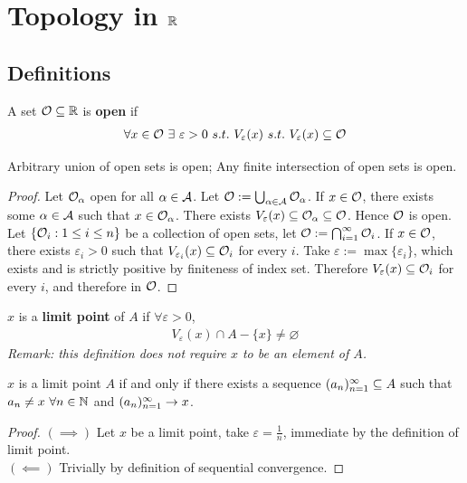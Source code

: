 \documentclass[11pt]{article}
\begin{document}
	\section{Topology in $\mathbb{R}$}
	\subsection{Definitions}
	\begin{definition}
		A set $\mathcal{{O}} \subseteq \mathbb{R}$ is \textbf{open} if
		\begin{align}
			\forall x \in \mc{O}\ \exists\ \varepsilon > 0\ s.t.\ V_\varepsilon(x)\ s.t.\ V_\varepsilon(x) \subseteq \mc{O}
		\end{align}
	\end{definition}
	
	\begin{theorem}
		Arbitrary union of open sets is open; Any finite intersection of open sets is open.
	\end{theorem}
	
	\begin{proof}
		Let $\mathcal{{O}}_\alpha$ open for all $\alpha \in \mathcal{{A}}$. Let $\mathcal{{O}} := \bigcup_{\alpha \in \mathcal{{A}}} \mathcal{{O}}_\alpha$. If $x \in \mathcal{{O}}$, there exists some $\alpha \in \mathcal{{A}}$ such that $x \in \mathcal{{O}}_\alpha$. There exists $V_\varepsilon(x) \subseteq \mathcal{{O}}_{\alpha} \subseteq \mathcal{{O}}$. Hence $\mathcal{{O}}$ is open.
		\\
		Let $\{\mathcal{{O}}_i: 1 \leq i \leq n\}$ be a collection of open sets, let $\mathcal{{O}} := \bigcap_{i=1}^\infty \mathcal{{O}}_i$. If $x \in \mathcal{{O}}$, there exists $\varepsilon_i > 0$ such that $V_{\varepsilon_i}(x) \subseteq \mathcal{{O}}_i$ for every $i$. Take $\varepsilon := \max\{\varepsilon_i\}$, which exists and is strictly positive by finiteness of index set. Therefore $V_\varepsilon(x) \subseteq \mathcal{{O}}_i$ for every $i$, and therefore in $\mathcal{{O}}$.
	\end{proof}
	
	\begin{definition}
		$x$ is a \textbf{limit point} of $A$ if $\forall \varepsilon > 0$,
		\begin{align}
			V_\varepsilon(x) \cap A - \{x\} \neq \varnothing
		\end{align}
		\emph{Remark: this definition does not require $x$ to be an element of $A$.}
	\end{definition}
	
	\begin{theorem}
		$x$ is a limit point $A$ if and only if there exists a sequence $({a}_{n})_{{n}=1}^\infty \subseteq A$ such that \ul{$a_n \neq x\ \forall n \in \mathbb{N}$} and $({a}_{n})_{{n}=1}^\infty \to x$.
	\end{theorem}
	\begin{proof}
		$(\implies)$ Let $x$ be a limit point, take $\varepsilon = \frac{1}{n}$, immediate by the definition of limit point. \\
		$(\impliedby)$ Trivially by definition of sequential convergence.
	\end{proof}
	
\end{document}
